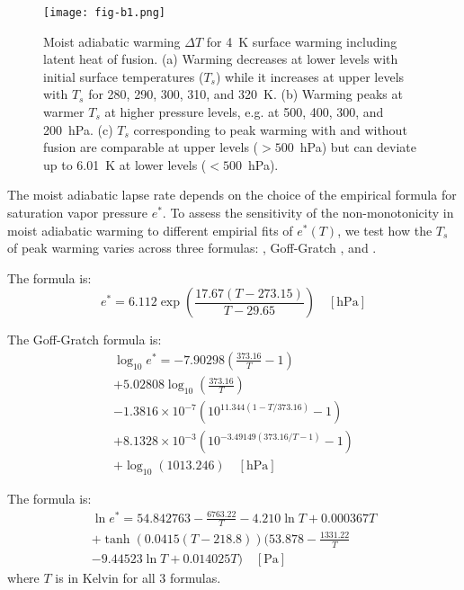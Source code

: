 \documentclass[draft,twocol]{ametsocV6.1}
\begin{document}
\begin{figure}[htbp]
 \centering
 \texttt{[image: fig-b1.png]}
 \caption{Moist adiabatic warming $\Delta T$ for 4~K surface warming including latent heat of fusion. (a) Warming decreases at lower levels with initial surface temperatures ($T_s$) while it increases at upper levels with $T_s$ for 280, 290, 300, 310, and 320~K. (b) Warming peaks at warmer $T_s$ at higher pressure levels, e.g. at 500, 400, 300, and 200~hPa. (c) $T_s$ corresponding to peak warming with and without fusion are comparable at upper levels ($>500$~hPa) but can deviate up to 6.01~K at lower levels ($<500$~hPa).}\label{fig:fig-b1}
\end{figure}

\appendix[C] 
\label{app:svp}
The moist adiabatic lapse rate depends on the choice of the empirical formula for saturation vapor pressure $e^*$. To assess the sensitivity of the non-monotonicity in moist adiabatic warming to different empirial fits of $e^*(T)$, we test how the $T_s$ of peak warming varies across three formulas: \cite{bolton1980}, Goff-Gratch \citep[as described in][]{list1949}, and \cite{murphy2005}.

The \cite{bolton1980} formula is:
\begin{equation}
e^* = 6.112 \exp\left(\frac{17.67 (T - 273.15)}{T - 29.65}\right) \quad [\text{hPa}]
\label{eq:bolton}
\end{equation}

The Goff-Gratch formula is:
\begin{multline}
\log_{10} e^* = -7.90298 \left(\frac{373.16}{T} - 1\right)\\ + 5.02808 \log_{10}\left(\frac{373.16}{T}\right)\\ - 1.3816 \times 10^{-7} \left(10^{11.344 (1 - T/373.16)} - 1\right)\\ + 8.1328 \times 10^{-3} \left(10^{-3.49149 (373.16/T - 1)} - 1\right)\\ + \log_{10}(1013.246) \quad [\text{hPa}]
\end{multline}

The \cite{murphy2005} formula is:
\begin{multline}
\ln e^* = 54.842763 - \frac{6763.22}{T} - 4.210 \ln T + 0.000367 T\\ + \tanh\left(0.0415 (T - 218.8)\right) \biggl(53.878 - \frac{1331.22}{T}\\ - 9.44523 \ln T + 0.014025 T\biggl) \quad [\text{Pa}]
\end{multline}
where $T$ is in Kelvin for all 3 formulas.
\end{document}
